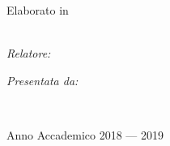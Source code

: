 \documentclass[
11pt, %
italian, %
singlespacing, %
headsepline, %
]{MastersDoctoralThesis} %
\author{Leonardo \textsc{Marini}} %
\begin{document}
\frontmatter %

\pagestyle{plain} %


\begin{titlepage}
\begin{center}

\vspace*{.06\textheight}
{\scshape\large \MakeUppercase{\univname}\\\campname\par}\vspace{1.5cm} %
\textsc{\deptname\\\facname}\\ %

\vfill
\HRule \\[0.4cm] %
{\huge \bfseries \ttitle\par}\vspace{0.4cm} %
\HRule \\[1.5cm] %
 
\vfill
\large {Elaborato in \\\textit{\subjectname}}\\[0.3cm] %
\vfill

\begin{minipage}[t]{0.4\textwidth}
\begin{flushleft} \large
\emph{Relatore:}\\
\href{https://www.unibo.it/sitoweb/damiana.lazzaro}{\supname} %
\end{flushleft}
\end{minipage}
\begin{minipage}[t]{0.4\textwidth}
\begin{flushright} \large
\emph{Presentata da:} \\
\href{https://www.linkedin.com/in/leonardo-marini-it/}{\authorname} %
\end{flushright}
\end{minipage}\\[3cm]
 
\vfill

{\large Anno Accademico 2018 --- 2019}\\[4cm] %
 
\vfill
\end{center}
\end{titlepage}
\end{document}
